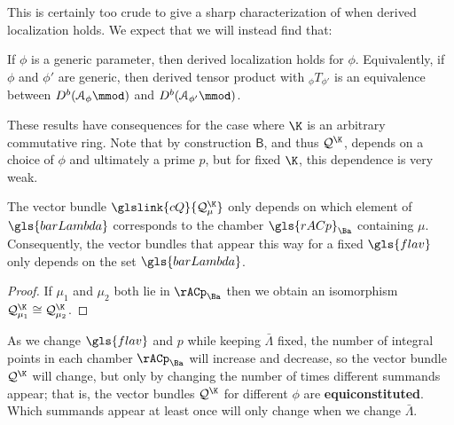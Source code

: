 This is certainly too crude to give a sharp characterization of when derived localization holds.  We expect that we will instead find that:
\begin{conjecture}
If $\phi$ is a generic parameter, then derived localization holds for $\phi$.  Equivalently, if $\phi$ and $\phi'$ are generic, then derived tensor product with ${}_{\phi}T_{\phi'}$ is an equivalence between $D^b(\EuScript{A}_\phi\mmod)$ and $D^b(\EuScript{A}_{\phi'}\mmod)$.
\end{conjecture}

These results have consequences for the case where $\K$ is an arbitrary commutative ring.
Note that by construction $\mathsf{B}$, and thus $\mathcal{Q}^{\K}$, depends on a choice of
$\phi$ and ultimately a prime $p$, but for fixed $\K$, this dependence is very
weak.
\begin{lemma}\label{lem:doesnt-depend2}
  The vector bundle
   $\glslink{cQ}{\mathcal{Q}_\mu^{\K}}$ only
  depends on which element of $\gls{barLambda}$ corresponds to the
  chamber $\gls{rACp}_{\Ba}$ containing $\mu$. Consequently, the vector bundles that appear this way for a fixed $\gls{flav}$ only depends on the set $\gls{barLambda}$.
\end{lemma}
\begin{proof} If
  $\mu_1$ and $\mu_2$ both lie in $\rACp_{\Ba}$ then we obtain an
  isomorphism $\mathcal{Q}_{\mu_1}^{\K}\cong \mathcal{Q}_{\mu_2}^{\K}$.
\end{proof}
As we change $\gls{flav}$ and $p$ while keeping $\bar \Lambda$ fixed, the
number of integral points in each chamber $\rACp_{\Ba}$  will increase and decrease, so the vector
bundle $\mathcal{Q}^{\K}$ will change, but only by changing the
number of times different summands appear; that is, the vector bundles $\mathcal{Q}^{\K}$ for different $\phi$ are {\bf equiconstituted}.  Which summands appear at
least once will only change when we change $\bar \Lambda$.  


